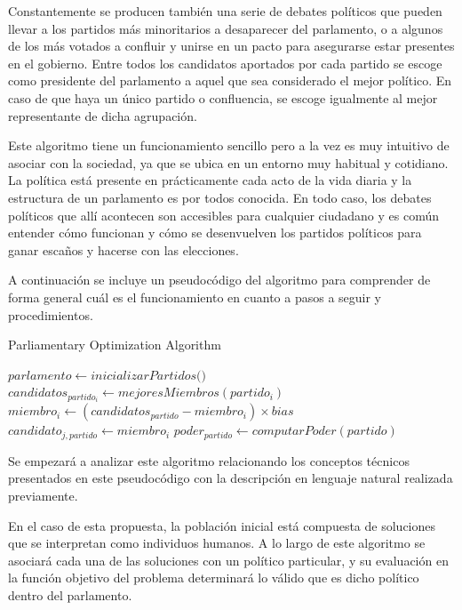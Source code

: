 Constantemente se producen también una serie de debates políticos que pueden llevar a los partidos más minoritarios a desaparecer del parlamento, o a algunos de los más votados a confluir y unirse en un pacto para asegurarse estar presentes en el gobierno. Entre todos los candidatos aportados por cada partido se escoge como presidente del parlamento a aquel que sea considerado el mejor político. En caso de que haya un único partido o confluencia, se escoge igualmente al mejor representante de dicha agrupación.

Este algoritmo tiene un funcionamiento sencillo pero a la vez es muy intuitivo de asociar con la sociedad, ya que se ubica en un entorno muy habitual y cotidiano. La política está presente en prácticamente cada acto de la vida diaria y la estructura de un parlamento es por todos conocida. En todo caso, los debates políticos que allí acontecen son accesibles para cualquier ciudadano y es común entender cómo funcionan y cómo se desenvuelven los partidos políticos para ganar escaños y hacerse con las elecciones.

A continuación se incluye un pseudocódigo del algoritmo para comprender de forma general cuál es el funcionamiento en cuanto a pasos a seguir y procedimientos.

\begin{algorithm}
	\caption{Parliamentary Optimization Algorithm}
	\begin{algorithmic}[1]
		\State $parlamento \gets \textit{inicializarPartidos()}$
		\State $candidatos_{partido_i} \gets mejoresMiembros(partido_i)$
		\State $miembro_i \gets (candidatos_{partido} - miembro_i) \times bias$
		\State $candidato_{j,partido} \gets miembro_i$
		\EndIf
		\State $poder_{partido} \gets computarPoder(partido)$
		\EndFor
		\EndWhile
	\end{algorithmic}
\end{algorithm}

Se empezará a analizar este algoritmo relacionando los conceptos técnicos presentados en este pseudocódigo con la descripción en lenguaje natural realizada previamente.

En el caso de esta propuesta, la población inicial está compuesta de soluciones que se interpretan como individuos humanos. A lo largo de este algoritmo se asociará cada una de las soluciones con un político particular, y su evaluación en la función objetivo del problema determinará lo válido que es dicho político dentro del parlamento.

